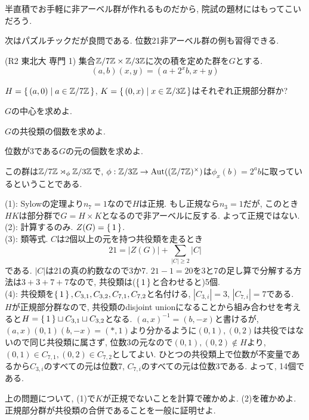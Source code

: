  半直積でお手軽に非アーベル群が作れるものだから, 院試の題材にはもってこいだろう.


次はパズルチックだが良問である. 位数21非アーベル群の例も習得できる.
\begin{egprob} (R2 東北大 専門 1)
集合$\mathbb{Z}/7\mathbb{Z}\times \mathbb{Z}/3\mathbb{Z}$に次の積を定めた群を$G$とする.
\[(a,b)(x,y) = (a+2^x b, x+y)\]
\ben
\item $H = \set{(a,0) \mid a\in \mathbb{Z}/7\mathbb{Z}}$, $K = \set{(0,x)\mid x\in \mathbb{Z}/3\mathbb{Z}}$はそれぞれ正規部分群か?
\item $G$の中心を求めよ.
\item $G$の共役類の個数を求めよ.
\item 位数が3である$G$の元の個数を求めよ.
\een
\end{egprob}

この群は$\mathbb{Z}/7\mathbb{Z}\rtimes_{\phi}\mathbb{Z}/3\mathbb{Z}$で, $\phi:\mathbb{Z}/3\mathbb{Z}\to \mathrm{Aut}((\mathbb{Z}/7\mathbb{Z})^{\times})$は$\phi_{x}(b) = 2^a b$に取っているということである.
\begin{egans}
(1): Sylowの定理より$n_7 = 1$なので$H$は正規. もし正規なら$n_3 = 1$だが, このとき$HK$は部分群で$G = H\times K$となるので非アーベルに反する. よって正規ではない. \\
(2): 計算するのみ. $Z(G) = \set{1}$. \\
(3): 類等式. $C$は2個以上の元を持つ共役類を走るとき
\[21 = |Z(G)| + \sum_{|C| \geq 2} |C|\]
である. $|C|$は21の真の約数なので3か7. $21-1 = 20$を3と7の足し算で分解する方法は$3+3+7+7$なので, 共役類は($\set{1}$と合わせると)5個. \\
(4): 共役類を$\set{1}, C_{3,1}, C_{3,2}, C_{7,1},C_{7,2}$と名付ける, $|C_{3,i}| = 3$, $|C_{7,i}| = 7$である. \\
$H$が正規部分群なので, 共役類のdisjoint unionになることから組み合わせを考えると$H=\set{1}\sqcup C_{3,1}\sqcup C_{3,2}$となる. $(a,x)^{-1} = (b,-x)$と書けるが,
$(a,x)(0,1)(b,-x) = (\ast, 1)$より分かるように$(0,1), (0,2)$は共役ではないので同じ共役類に属さず, 位数3の元なので$(0,1), (0,2)\notin H$より, $(0,1)\in C_{7,1}, (0,2)\in C_{7,2}$としてよい. ひとつの共役類上で位数が不変量であるから$C_{3,i}$のすべての元は位数7, $C_{7,i}$のすべての元は位数3である. よって, 14個である.

\end{egans}
\begin{prac}
上の問題について, (1)で$K$が正規でないことを計算で確かめよ. (2)を確かめよ. 正規部分群が共役類の合併であることを一般に証明せよ.
\end{prac}







